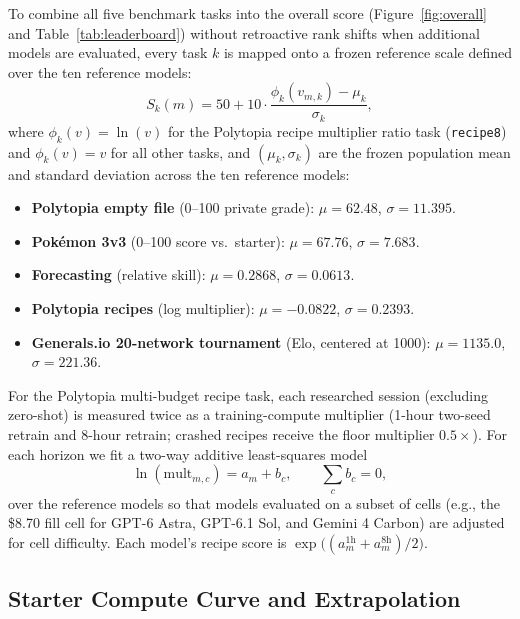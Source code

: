 \documentclass[11pt,letterpaper]{article}
\newcommand{\pokemon}{Pok\'emon}
\begin{document}
To combine all five benchmark tasks into the overall score (Figure~\ref{fig:overall} and Table~\ref{tab:leaderboard}) without retroactive rank shifts when additional models are evaluated, every task $k$ is mapped onto a frozen reference scale defined over the ten reference models:
\begin{equation}
  S_k(m) = 50 + 10 \cdot \frac{\phi_k(v_{m,k}) - \mu_k}{\sigma_k},
\end{equation}
where $\phi_k(v) = \ln(v)$ for the Polytopia recipe multiplier ratio task (\texttt{recipe8}) and $\phi_k(v) = v$ for all other tasks, and $(\mu_k, \sigma_k)$ are the frozen population mean and standard deviation across the ten reference models:
\begin{itemize}
  \item \textbf{Polytopia empty file} (0--100 private grade): $\mu = 62.48$, $\sigma = 11.395$.
  \item \textbf{\pokemon{} 3v3} (0--100 score vs.\ starter): $\mu = 67.76$, $\sigma = 7.683$.
  \item \textbf{Forecasting} (relative skill): $\mu = 0.2868$, $\sigma = 0.0613$.
  \item \textbf{Polytopia recipes} (log multiplier): $\mu = -0.0822$, $\sigma = 0.2393$.
  \item \textbf{Generals.io 20-network tournament} (Elo, centered at 1000): $\mu = 1135.0$, $\sigma = 221.36$.
\end{itemize}

For the Polytopia multi-budget recipe task, each researched session (excluding zero-shot) is measured twice as a training-compute multiplier (1-hour two-seed retrain and 8-hour retrain; crashed recipes receive the floor multiplier $0.5\times$). For each horizon we fit a two-way additive least-squares model
\begin{equation}
  \ln(\text{mult}_{m,c}) = a_m + b_c, \qquad \sum_c b_c = 0,
\end{equation}
over the reference models so that models evaluated on a subset of cells (e.g., the \$8.70 fill cell for GPT-6 Astra, GPT-6.1 Sol, and Gemini 4 Carbon) are adjusted for cell difficulty. Each model's recipe score is $\exp\bigl((a_m^{\text{1h}} + a_m^{\text{8h}})/2\bigr)$.

\subsection{Starter Compute Curve and Extrapolation}
\label{app:multiplier}
\end{document}
